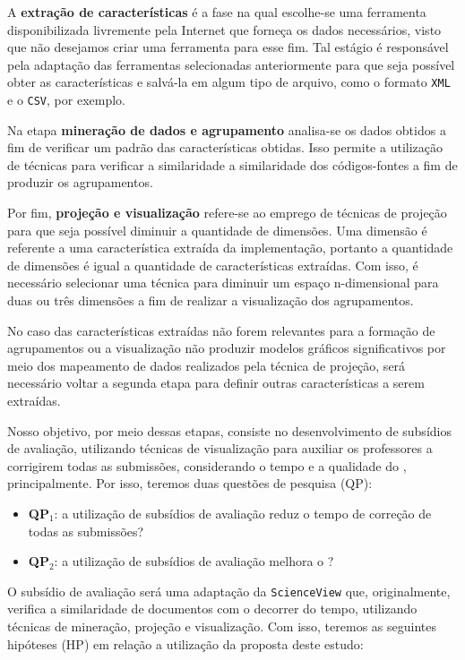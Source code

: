 	A \textbf{extração de características} é a fase na qual escolhe-se uma ferramenta
	disponibilizada livremente pela Internet que forneça os dados necessários, visto
	que não desejamos criar uma ferramenta para esse fim. Tal estágio é responsável pela
	adaptação das ferramentas selecionadas anteriormente para que seja possível obter
	as características e salvá-la em algum tipo de arquivo, como o formato \texttt{XML}
	e o \texttt{CSV}, por exemplo.

	Na etapa \textbf{mineração de dados e agrupamento} analisa-se os dados obtidos a
	fim de verificar um padrão das características obtidas. Isso permite a utilização
	de técnicas para verificar a similaridade a similaridade dos códigos-fontes a fim
	de produzir os agrupamentos.
	
	Por fim, \textbf{projeção e visualização} refere-se ao emprego de técnicas de
	projeção para que seja possível diminuir a quantidade de dimensões. Uma dimensão
	é referente a uma característica extraída da implementação, portanto a quantidade
	de dimensões é igual a quantidade de características extraídas. Com isso, é
	necessário selecionar uma técnica para diminuir um espaço n-dimensional para
	duas ou três dimensões a fim de realizar a visualização dos agrupamentos.
	
	No caso das características extraídas não forem relevantes para a formação de
	agrupamentos ou a visualização não produzir modelos gráficos significativos por
	meio dos mapeamento de dados realizados pela técnica de projeção, será necessário
	voltar a segunda etapa para definir outras características a serem extraídas.
	
	Nosso objetivo, por meio dessas etapas, consiste no desenvolvimento de subsídios
	de avaliação, utilizando técnicas de visualização para auxiliar os professores a
	corrigirem todas as submissões, considerando o tempo e a qualidade do ,
	principalmente. Por isso, teremos duas questões de pesquisa (QP):
	
	\begin{itemize}
		\item \textbf{QP$_1$}: a utilização de subsídios de avaliação reduz o tempo
		de correção de todas as submissões?
		\item \textbf{QP$_2$}: a utilização de subsídios de avaliação melhora o ?
	\end{itemize}
	
	O subsídio de avaliação será uma adaptação da \texttt{ScienceView} \cite{Alencar-etal:2012}
	que, originalmente, verifica a similaridade de documentos com o decorrer do tempo,
	utilizando técnicas de mineração, projeção e visualização. Com isso, teremos as
	seguintes hipóteses (HP) em relação a utilização da proposta deste estudo:
	
